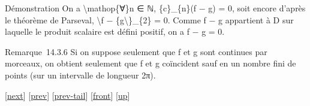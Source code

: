 \documentclass[]{article}
\begin{document}
Démonstration On a \textbackslash{}mathop\{∀\}n ∈ ℕ, \{c\}\_\{n\}(f − g)
= 0, soit encore d'après le théorème de Parseval,
\textbackslash{}\textbar{}f − \{g\textbackslash{}\textbar{}\}\_\{2\} =
0. Comme f − g appartient à D sur laquelle le produit scalaire est
défini positif, on a f − g = 0.

Remarque~14.3.6 Si on suppose seulement que f et g sont continues par
morceaux, on obtient seulement que f et g coïncident sauf en un nombre
fini de points (sur un intervalle de longueur 2π).

{[}\href{coursse80.html}{next}{]} {[}\href{coursse78.html}{prev}{]}
{[}\href{coursse78.html\#tailcoursse78.html}{prev-tail}{]}
{[}\href{coursse79.html}{front}{]}
{[}\href{coursch15.html\#coursse79.html}{up}{]}
\end{document}
